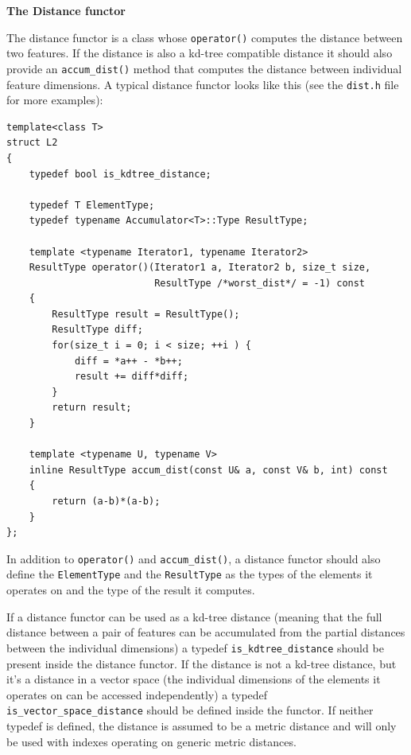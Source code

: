 \documentclass[letter,10pt]{article}
\begin{document}
\textbf{The Distance functor}

The distance functor is a class whose \texttt{operator()} computes the distance between two features. If the distance is
also a kd-tree compatible distance it should also provide an \texttt{accum\_dist()} method that computes the distance
between individual feature dimensions. A typical distance functor looks like this (see the \texttt{dist.h} file for more
examples):

\begin{Verbatim}[fontsize=\footnotesize,frame=single]
template<class T>
struct L2
{
    typedef bool is_kdtree_distance;

    typedef T ElementType;
    typedef typename Accumulator<T>::Type ResultType;

    template <typename Iterator1, typename Iterator2>
    ResultType operator()(Iterator1 a, Iterator2 b, size_t size, 
                          ResultType /*worst_dist*/ = -1) const
    {
        ResultType result = ResultType();
        ResultType diff;
        for(size_t i = 0; i < size; ++i ) {
            diff = *a++ - *b++;
            result += diff*diff;
        }
        return result;
    }

    template <typename U, typename V>
    inline ResultType accum_dist(const U& a, const V& b, int) const
    {
        return (a-b)*(a-b);
    }
};
\end{Verbatim}

In addition to \texttt{operator()} and \texttt{accum\_dist()}, a distance functor should also define the
\texttt{ElementType} and the \texttt{ResultType} as the types of the elements it operates on and the type of the result
it computes.

If a distance functor can be used as a kd-tree distance (meaning that the full distance between a pair of features can
be accumulated from the partial distances between the individual dimensions) a typedef \texttt{is\_kdtree\_distance}
should be present inside the distance functor. If the distance is not a kd-tree distance, but it's a distance in a
vector space (the individual dimensions of the elements it operates on can be accessed independently) a typedef
\texttt{is\_vector\_space\_distance} should be defined inside the functor. If neither typedef is defined, the distance
is assumed to be a metric distance and will only be used with indexes operating on generic metric distances.
\\
\end{document}
